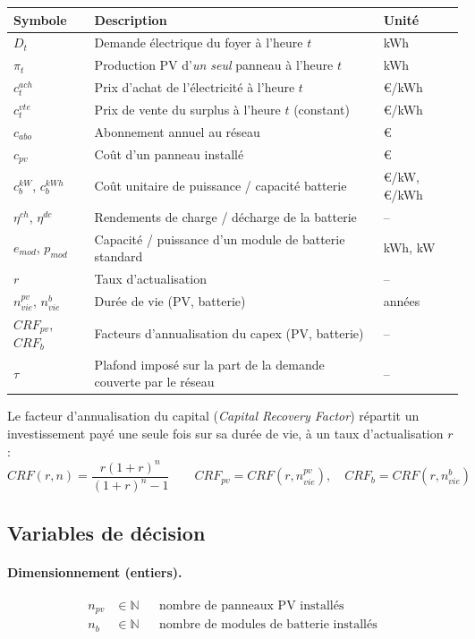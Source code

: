 \documentclass[11pt]{article}
\begin{document}
\begin{center}
\begin{tabular}{@{}lll@{}}
\toprule
Symbole & Description & Unité \\
\midrule
$D_t$ & Demande électrique du foyer à l'heure $t$ & kWh \\
$\pi_t$ & Production PV d'\emph{un seul} panneau à l'heure $t$ & kWh \\
$c^{ach}_t$ & Prix d'achat de l'électricité à l'heure $t$ & €/kWh \\
$c^{vte}_t$ & Prix de vente du surplus à l'heure $t$ (constant) & €/kWh \\
$c_{abo}$ & Abonnement annuel au réseau & € \\
$c_{pv}$ & Coût d'un panneau installé & € \\
$c^{kW}_{b}$, $c^{kWh}_{b}$ & Coût unitaire de puissance / capacité batterie & €/kW, €/kWh \\
$\eta^{ch}$, $\eta^{dc}$ & Rendements de charge / décharge de la batterie & -- \\
$e_{mod}$, $p_{mod}$ & Capacité / puissance d'un module de batterie standard & kWh, kW \\
$r$ & Taux d'actualisation & -- \\
$n^{pv}_{vie}$, $n^{b}_{vie}$ & Durée de vie (PV, batterie) & années \\
$CRF_{pv}$, $CRF_{b}$ & Facteurs d'annualisation du capex (PV, batterie) & -- \\
$\tau$ & Plafond imposé sur la part de la demande couverte par le réseau & -- \\
\bottomrule
\end{tabular}
\end{center}

Le facteur d'annualisation du capital (\emph{Capital Recovery Factor}) répartit un
investissement payé une seule fois sur sa durée de vie, à un taux d'actualisation $r$ :
\begin{equation}
CRF(r, n) = \frac{r(1+r)^n}{(1+r)^n - 1}
\qquad CRF_{pv} = CRF(r, n^{pv}_{vie}), \quad CRF_{b} = CRF(r, n^{b}_{vie})
\end{equation}

\subsection{Variables de décision}

\paragraph{Dimensionnement (entiers).}
\begin{align*}
n_{pv} &\in \mathbb{N} && \text{nombre de panneaux PV installés} \\
n_{b} &\in \mathbb{N} && \text{nombre de modules de batterie installés}
\end{align*}
\end{document}
